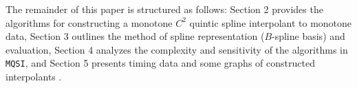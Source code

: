 The remainder of this paper is structured as follows: Section 2
provides the algorithms for constructing a monotone $C^2$ quintic
spline interpolant to monotone data, Section 3 outlines the method of
spline representation ($B$-spline basis) and evaluation, Section 4
analyzes the complexity and sensitivity of the algorithms in {\tt
  MQSI}, and Section 5 presents timing data and some graphs of
constructed interpolants .

